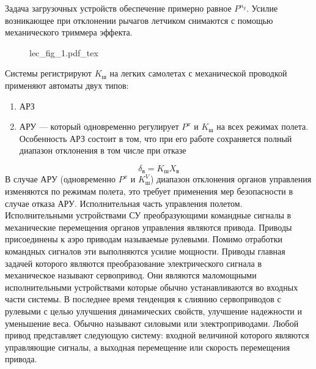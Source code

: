 \documentclass{article}
\begin{document}
Задача загрузочных устройств обеспечение примерно равное $P^{n_y}$. Усилие
возникающее при отклонении рычагов летчиком снимаются с помощью механического
триммера эффекта.
\begin{figure}[ht!]
    \centering
    {lec_fig_1.pdf_tex}
\end{figure}
Системы регистрируют $K_\text{ш}$ на легких самолетах с механической проводкой
применяют автоматы двух типов:
\begin{enumerate}
    \item АРЗ
    \item АРУ --- который одновременно регулирует $P^{x}$ и $K_\text{ш}$ на
        всех режимах полета. Особенность АРЗ состоит в том, что при его работе
        сохраняется полный диапазон отклонения в том числе при отказе
\end{enumerate}
\[
    \delta_\text{в} = K_\text{ш} X_\text{в}
\]
В случае АРУ (одновременно $P^{x}$ и $K_\text{ш}^V$) диапазон отклонения
органов управления изменяются по режимам полета, это требует применения мер
безопасности в случае отказа АРУ.
Исполнительная часть управления полетом.
Исполнительными устройствами СУ преобразующими командные сигналы в механические
перемещения органов управления являются привода. Приводы присоединены к аэро
приводам называемые рулевыми. Помимо отработки командных сигналов эти
выполняются усилие мощности. Приводы главная задачей которого являются
преобразование электрического сигнала в механическое называют сервопривод. Они
являются маломощными исполнительными устройствами которые обычно
устанавливаются во входных части системы. В последнее время тенденция к слиянию
сервоприводов с рулевыми с целью улучшения динамических свойств, улучшение
надежности и уменьшение веса. Обычно называют силовыми или электроприводами.
Любой привод представляет следующую систему: входной величиной которого
являются управляющие сигналы, а выходная перемещение или скорость перемещения
привода.
\end{document}
